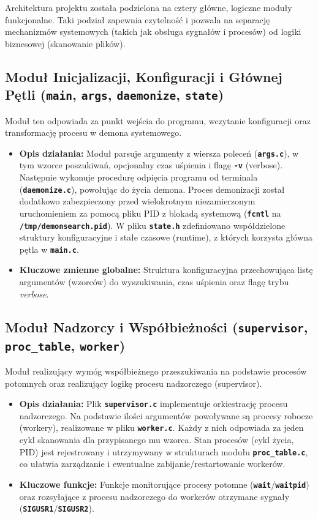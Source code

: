 \documentclass{article}
\begin{document}
	Architektura projektu została podzielona na cztery główne, logiczne moduły funkcjonalne. Taki podział zapewnia czytelność i pozwala na separację mechanizmów systemowych (takich jak obsługa sygnałów i procesów) od logiki biznesowej (skanowanie plików).
	
	\subsection{Moduł Inicjalizacji, Konfiguracji i Głównej Pętli (\textbf{\texttt{main}}, \textbf{\texttt{args}}, \textbf{\texttt{daemonize}}, \textbf{\texttt{state}})}
	Moduł ten odpowiada za punkt wejścia do programu, wczytanie konfiguracji oraz transformację procesu w demona systemowego.
	\begin{itemize}
		\item \textbf{Opis działania:} Moduł parsuje argumenty z wiersza poleceń (\textbf{\texttt{args.c}}), w tym wzorce poszukiwań, opcjonalny czas uśpienia i flagę \textbf{\texttt{-v}} (verbose). Następnie wykonuje procedurę odpięcia programu od terminala (\textbf{\texttt{daemonize.c}}), powołując do życia demona. Proces demonizacji został dodatkowo zabezpieczony przed wielokrotnym niezamierzonym uruchomieniem za pomocą pliku PID z blokadą systemową (\textbf{\texttt{fcntl}} na \textbf{\texttt{/tmp/demonsearch.pid}}). W pliku \textbf{\texttt{state.h}} zdefiniowano współdzielone struktury konfiguracyjne i stałe czasowe (runtime), z których korzysta główna pętla w \textbf{\texttt{main.c}}.
		\item \textbf{Kluczowe zmienne globalne:} Struktura konfiguracyjna przechowująca listę argumentów (wzorców) do wyszukiwania, czas uśpienia oraz flagę trybu \textit{verbose}.
	\end{itemize}
	
	\subsection{Moduł Nadzorcy i Współbieżności (\textbf{\texttt{supervisor}}, \textbf{\texttt{proc\_table}}, \textbf{\texttt{worker}})}
	Moduł realizujący wymóg współbieżnego przeszukiwania na podstawie procesów potomnych oraz realizujący logikę procesu nadzorczego (supervisor).
	\begin{itemize}
		\item \textbf{Opis działania:} Plik \textbf{\texttt{supervisor.c}} implementuje orkiestrację procesu nadzorczego. Na podstawie ilości argumentów powoływane są procesy robocze (workery), realizowane w pliku \textbf{\texttt{worker.c}}. Każdy z nich odpowiada za jeden cykl skanowania dla przypisanego mu wzorca. Stan procesów (cykl życia, PID) jest rejestrowany i utrzymywany w strukturach modułu \textbf{\texttt{proc\_table.c}}, co ułatwia zarządzanie i ewentualne zabijanie/restartowanie workerów.
		\item \textbf{Kluczowe funkcje:} Funkcje monitorujące procesy potomne (\textbf{\texttt{wait}}/\textbf{\texttt{waitpid}}) oraz rozsyłające z procesu nadzorczego do workerów otrzymane sygnały (\textbf{\texttt{SIGUSR1}}/\textbf{\texttt{SIGUSR2}}).
	\end{itemize}
	
\end{document}
